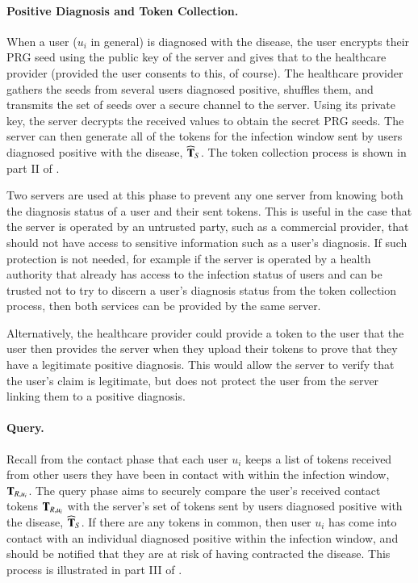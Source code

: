 \paragraph{Positive Diagnosis and Token Collection.}

When a user ($u_i$ in general) is diagnosed with the disease, the user encrypts their PRG seed using the public key of the \dect server and gives that to the healthcare provider (provided the user consents to this, of course). The healthcare provider gathers the seeds from several users diagnosed positive, shuffles them, and transmits the set of seeds over a secure channel to the \dect server. Using its private key, the \dect server decrypts the received values to obtain the secret PRG seeds. The \dect server can then generate all of the tokens for the infection window sent by users diagnosed positive with the disease, $\widehat{\mathbf{T}}_S$. The token collection process is shown in part II of .

Two servers are used at this phase to prevent any one server from knowing both the diagnosis status of a user and their sent tokens. This is useful in the case that the \dect server is operated by an untrusted party, such as a commercial provider, that should not have access to sensitive information such as a user's diagnosis. If such protection is not needed, for example if the \dect server is operated by a health authority that already has access to the infection status of users and can be trusted not to try to discern a user's diagnosis status from the token collection process, then both services can be provided by the same server.

Alternatively, the healthcare provider could provide a token to the user that the user then provides the \dect server when they upload their tokens to prove that they have a legitimate positive diagnosis. This would allow the \dect server to verify that the user's claim is legitimate, but does not protect the user from the server linking them to a positive diagnosis.

\paragraph{Query.}
\label{sub:pect_psi}

Recall from the contact phase that each user $u_i$ keeps a list of tokens received from other users they have been in contact with within the infection window, $\mathbf{T}_{R,u_i}$. The query phase aims to securely compare the user's received contact tokens $\mathbf{T}_{R,u_i}$ with the \dect server's set of tokens sent by users diagnosed positive with the disease, $\widehat{\mathbf{T}}_S$. If there are any tokens in common, then user $u_i$ has come into contact with an individual diagnosed positive within the infection window, and should be notified that they are at risk of having contracted the disease. This process is illustrated in part III of .

